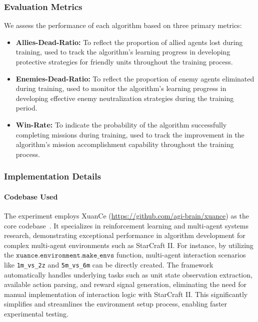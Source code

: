 \subsubsection{Evaluation Metrics}
We assess the performance of each algorithm based on three primary metrics:
\begin{itemize}
    \item \textbf{Allies-Dead-Ratio:} To reflect the proportion of allied agents lost during training, used to track the algorithm's learning progress in developing protective strategies for friendly units throughout the training process.
    \item \textbf{Enemies-Dead-Ratio:} To reflect the proportion of enemy agents eliminated during training, used to monitor the algorithm's learning progress in developing effective enemy neutralization strategies during the training period.
    \item \textbf{Win-Rate:} To indicate the probability of the algorithm successfully completing missions during training, used to track the improvement in the algorithm's mission accomplishment capability throughout the training process.
\end{itemize}

\subsubsection{Implementation Details}
\paragraph{Codebase Used}
The experiment employs XuanCe (\url{https://github.com/agi-brain/xuance}) as the\\ core codebase~\cite{liuXuanCeComprehensiveUnified2023}.\@
It specializes in reinforcement learning and multi-agent systems research, demonstrating exceptional performance in algorithm development for complex multi-agent environments such as StarCraft II.
For instance, by utilizing the $\texttt{xuance.environment.make\_envs}$ function, multi-agent interaction scenarios like \texttt{1m\_vs\_2z} and \texttt{5m\_vs\_6m} can be directly created. The framework automatically handles underlying tasks such as unit state observation extraction, available action parsing, and reward signal generation, eliminating the need for manual implementation of interaction logic with StarCraft II.
This significantly simplifies and streamlines the environment setup process, enabling faster experimental testing.

